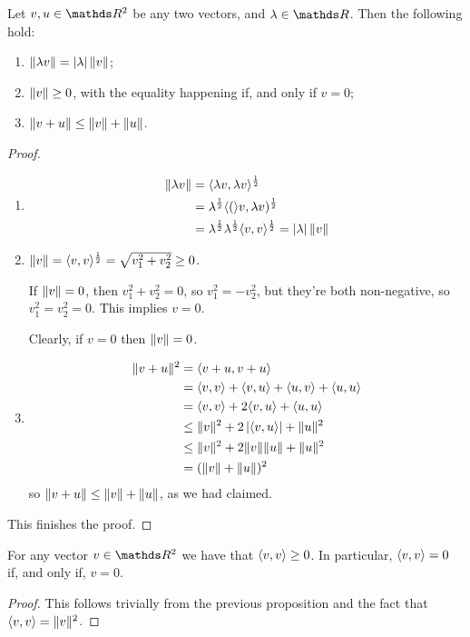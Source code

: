 \begin{prop}
	Let $v,u\in \R^2$ be any two vectors, and $\lambda \in \R$. Then the following hold:
	\begin{enumerate}
		\item $\lVert\lambda v\rVert=\left\vert\lambda\right\vert\lVert v\rVert$;
		\item $\lVert v\rVert\geq0$, with the equality happening if, and only if $v=0$;
		\item $\lVert v+u\rVert\leq \lVert v\rVert+\lVert u\rVert$.
	\end{enumerate}
\end{prop}
\begin{proof}
	\begin{enumerate}
		\item \begin{align*}
			\lVert\lambda v\rVert&=\langle \lambda v,\lambda v\rangle^{\frac{1}{2}}\\
			&=\lambda^\frac{1}{2}\langle (\rangle v,\lambda v)^{\frac{1}{2}}\\
			&=\lambda^\frac{1}{2}\lambda^\frac{1}{2}\langle v,v\rangle^\frac{1}{2}=\left\vert\lambda\right\vert\lVert v\rVert
		\end{align*}
		
		\item $\lVert v\rVert=\langle v,v\rangle^\frac{1}{2}=\sqrt{v_1^2+v_2^2}\geq 0$.
		
		If $\lVert v\rVert=0$, then $v_1^2+v_2^2=0$, so $v_1^2=-v_2^2$, but they're both non-negative, so $v_1^2=v_2^2=0$. This implies $v=0$.
		
		Clearly, if $v=0$ then $\lVert v\rVert=0$.
		
		\item \begin{align*}
			\lVert v+u\rVert^2&=\langle v+u,v+u\rangle\\
			&=\langle v,v\rangle+\langle v,u\rangle+\langle u,v\rangle+\langle u,u\rangle\\
			&=\langle v,v\rangle+2\langle v,u\rangle+\langle u,u\rangle\\
			&\leq \lVert v\rVert^2+2\left\vert\langle v,u\rangle\right\vert+\lVert u\rVert^2\\
			&\le \lVert v\rVert^2+2\lVert v\rVert\lVert u\rVert+\lVert u\rVert^2\\
			&=(\lVert v\rVert+\lVert u\rVert)^2			
		\end{align*}so $\lVert v+u\rVert\leq \lVert v\rVert+\lVert u\rVert$, as we had claimed.
	\end{enumerate}

This finishes the proof.
\end{proof}

\begin{cor}
	For any vector $v\in \R^2$ we have that $\langle v,v\rangle\geq 0$. In particular, $\langle v,v\rangle=0$ if, and only if, $v=0$.
\end{cor}
\begin{proof}
	This follows trivially from the previous proposition and the fact that $\langle v,v\rangle=\lVert v\rVert^2$.
\end{proof}

